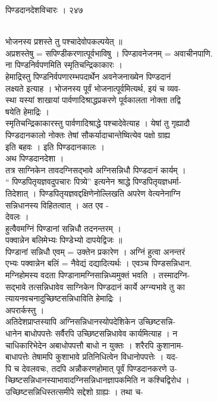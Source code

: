 \documentclass[11pt, openany]{book}
\begin{document}
{{{{{{{{ }{ पिण्डदानदेशविचारः । २४७}{\\
भोजनस्य प्रशस्ते तु पश्चादेवोपकल्पयेत् ॥\\
अप्रशस्तेषु = सपिण्डीकरणात्पूर्वभाविषु । पिण्डावनेजनम् = अवाचीनपाणि.\\
ना पिण्डनिर्वपणमिति स्मृतिचन्द्रिकाकारः ।\\
हेमाद्रिस्तु पिण्डनिर्वपणारम्भपदार्थेन अवनेजनाख्येन पिण्डदानं\\
लक्ष्यते इत्याह । भोजनस्य पूर्वं भोजनात्पूर्वमित्यर्थ, इयं च व्यव-\\
स्था यस्यां शाखायां पार्वणादिश्राद्धप्रकरणे पूर्वकालता नोक्ता तद्वि\\
षयेति हेमाद्रिः ।\\
स्मृतिचन्द्रिकाकारस्तु पार्वणादिश्राद्धे पश्चादेवेत्याह । येषां तु
गृह्यादौ\\
पिण्डदानकालो नोक्तः तेषां सौकर्यादाचान्तेष्वित्येव पक्षो ग्राह्य\\
इति बहवः । इति पिण्डदानकालः ।\\
अथ पिण्डदानदेशा ।\\
तत्र साग्निकेन तावदग्निसद्भावे अग्निसन्निधौ पिण्डदानं कार्यम् ।\\
`` पिण्डपितृयज्ञवदुपचारः पित्र्ये'' इत्यनेन श्राद्धे
पिण्डपितृयज्ञधर्मा-\\
तिदेशात् । पिण्डपितृयज्ञवद्दक्षिणेनोल्लिखति अपरेण वेत्यनेनाग्नि\\
सन्निधानस्य विहितत्वात् । अत एव -\\
देवलः ।\\
हुत्वैवमग्निं पिण्डानां सन्निधौ तदनन्तरम् ।\\
पक्वान्नेन बलिमेभ्यः पिण्डेभ्यो दापयेद्विजः ॥\\
पिण्डानां सन्निधौ एवम् = उक्तेन प्रकारेण । अग्निं हुत्वा अनन्तरं\\
एभ्यः पक्वान्नेन बलिं = नैवेद्यं दद्यादित्यर्थः । एवञ्च पिण्डसन्निधान.\\
मग्निहोमस्य वदता पिण्डानामग्निसान्निध्यमुक्तं भवति । तस्मादग्नि-\\
सद्भावे तत्सन्निधावेव साग्निकेन पिण्डदानं कार्ये अग्न्यभावे तु का\\
त्यायनवचनादुच्छिष्टसन्निधाविति हेमाद्रिः ।\\
अपरार्कस्तु ।\\
अतिदेशप्राप्तस्यापि अग्निसन्निधानस्योपदेशिकेन उच्छिष्टसन्नि-\\
धानेन बाधोपपत्तेः सर्वैरपि उच्छिष्टसन्निधावेव कार्यमित्याह । न\\
चाधिकारिभेदेन अबाधोपपत्तौ बाधो न युक्तः । शरैरपि कुशानाम-\\
बाधापत्तेः तेषामपि कुशाभावे प्रतिनिधित्वेन विधानोपपत्तेः । यद-\\
पि च देवलवचः, तदपि अन्नौकरणहोमात् पूर्वं पिण्डदानकरणे उ-\\
च्छिष्टसन्निधानस्याभावादग्निसन्निधानज्ञापकमिति न कश्चिद्विरोध ।\\
उच्छिष्टसन्निधिस्तत्समीपे सद्देशो ग्राह्यः । तथा च-

}}}}}}}}
\end{document}
